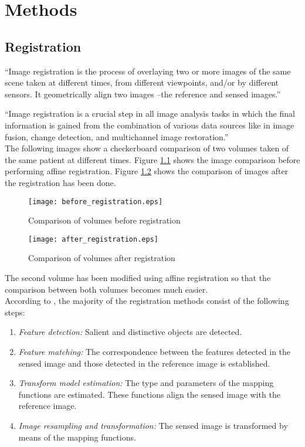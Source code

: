 \chapter{Methods}

\section{Registration}
``Image registration is the process of overlaying two or more images
of the same scene taken at different times, from different viewpoints,
and/or by different sensors. It geometrically align two images --the
reference and sensed images.''\cite{zitova}

``Image registration is a crucial step in all image analysis tasks in
which the final information is gained from the combination of various
data sources like in image fusion, change detection, and multichannel
image restoration.''\cite{zitova}\\


The following images show a checkerboard comparison of two volumes
taken of the same patient at different times. Figure \ref{before_reg}
shows the image comparison before performing affine
registration. Figure \ref{after_reg} shows the comparison of images
after the registration has been done.

\begin{figure}[htb]
  \centering
  \texttt{[image: before\_registration.eps]}
  \caption{Comparison of volumes before registration}
  \label{before_reg}
\end{figure}


\begin{figure}[htb]
  \centering
  \texttt{[image: after\_registration.eps]}
  \caption{Comparison of volumes after registration}
  \label{after_reg}
\end{figure}

The second volume has been modified using affine registration so that
the comparison between both volumes becomes much easier.\\

According to \cite{zitova}, the majority of the registration methods consist of the following steps:
\begin{enumerate}
\item \textit{Feature detection:} Salient and distinctive objects are detected.
\item \textit{Feature matching:} The correspondence between the features detected in the sensed image and those detected in the reference image is established.
\item \textit{Transform model estimation:} The type and parameters of the mapping functions are estimated. These functions align the sensed image with the reference image.
\item \textit{Image resampling and transformation:} The sensed image is transformed by means of the mapping functions.
\end{enumerate}


